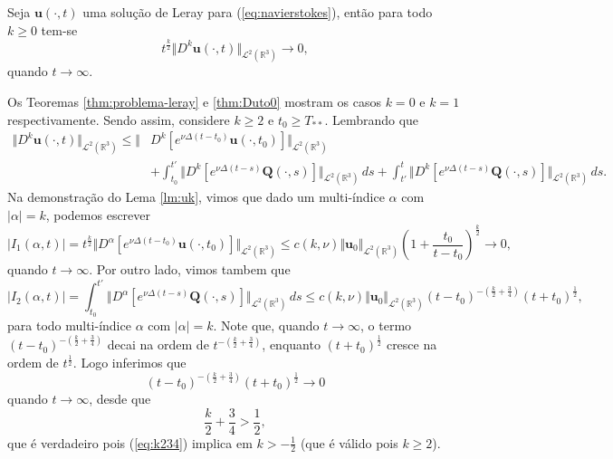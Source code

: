 \documentclass[a4paper, 11pt]{book}
\theoremstyle{definition}
\newcommand{\bR}{\mathbb{R}}
\newcommand{\bu}{\mathbf{u}}
\newcommand{\BQ}{\mathbf{Q}}
\newcommand{\cL}{\mathcal{L}}
\begin{document}
\begin{tbox}
    Seja $\bu(\cdot,t)$ uma solução de Leray para (\ref{eq:navierstokes}), então para todo $k \geqslant 0$ tem-se
    \[
        t^{\frac{k}{2}} \Vert D^k\bu(\cdot,t) \Vert_{\cL^2(\bR^3)} \to 0,
    \]
    quando $t \to \infty$.
\end{tbox}
\begin{prf}
    Os Teoremas \ref{thm:problema-leray} e \ref{thm:Duto0} mostram os casos $k = 0$ e $k = 1$ respectivamente. Sendo assim, considere $k \geqslant 2$ e $t_0 \geqslant T_{**}$.
    Lembrando que
    \[
        \begin{aligned}
            \Vert D^k \bu(\cdot,t) \Vert_{\cL^2(\bR^3)} \leqslant \Vert &D^k[e^{\nu \Delta(t-t_0)} \bu(\cdot,t_0)] \Vert_{\cL^2(\bR^3)}\\  &+ \int_{t_0}^{t'} \Vert D^k[e^{\nu \Delta (t-s)} \BQ(\cdot,s)] \Vert_{\cL^2(\bR^3)} \,ds
        + \int_{t'}^{t} \Vert D^k[e^{\nu \Delta (t-s)} \BQ(\cdot,s)] \Vert_{\cL^2(\bR^3)} \,ds.
        \end{aligned}
    \]
    Na demonstração do Lema \ref{lm:uk}, vimos que dado um multi-índice $\alpha$ com $|\alpha| = k$, podemos escrever
    \begin{equation} \label{eq:T1}
        |I_1(\alpha,t)| = t^{\frac{k}{2}}\Vert D^\alpha [e^{\nu\Delta(t-t_0)}\bu(\cdot,t_0)] \Vert_{\cL^2(\bR^3)} \leqslant c(k,\nu) \Vert \bu_0 \Vert_{\cL^2(\bR^3)} \left( 1 + \frac{t_0}{t - t_0} \right)^{\frac{k}{2}} \to 0,
    \end{equation}
    quando $t \to \infty$.
    Por outro lado, vimos tambem que
    \[
        |I_2(\alpha,t)| = \int_{t_0}^{t'} \Vert D^\alpha [e^{\nu\Delta (t-s)}\BQ(\cdot,s)] \Vert_{\cL^2(\bR^3)} \,ds \leqslant c(k,\nu) \Vert \bu_0 \Vert_{\cL^2(\bR^3)} (t - t_0)^{-\left( \frac{k}{2} + \frac{3}{4} \right)} (t + t_0)^{\frac{1}{2}},
    \]
    para todo multi-índice $\alpha$ com $|\alpha| = k$.
    Note que, quando $t \to \infty$, o termo $(t - t_0)^{-\left(\frac{k}{2} + \frac{3}{4}\right)}$ decai na ordem de $t^{-\left(\frac{k}{2} + \frac{3}{4}\right)}$, enquanto $(t + t_0)^{\frac{1}{2}}$ cresce na ordem de $t^{\frac{1}{2}}$.
    Logo inferimos que
    \[
        (t - t_0)^{-\left(\frac{k}{2} + \frac{3}{4}\right)} (t + t_0)^{\frac{1}{2}} \to 0
    \]
    quando $t \to \infty$, desde que
    \begin{equation} \label{eq:k234}
        \frac{k}{2} + \frac{3}{4} > \frac{1}{2},
    \end{equation}
    que é verdadeiro pois (\ref{eq:k234}) implica em $k > -\frac{1}{2}$ (que é válido pois $k \geqslant 2$).

\end{prf}
\end{document}

